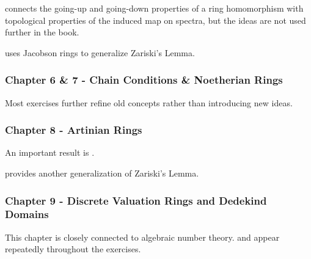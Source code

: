  connects the going-up and going-down properties of a ring homomorphism with topological properties of the induced map on spectra, but the ideas are not used further in the book.

 uses Jacobson rings to generalize Zariski's Lemma.

\subsubsection*{Chapter 6 \& 7 - Chain Conditions \& Noetherian Rings}

Most exercises further refine old concepts rather than introducing new ideas.

\subsubsection*{Chapter 8 - Artinian Rings}

An important result is .

 provides another generalization of Zariski's Lemma.

\subsubsection*{Chapter 9 - Discrete Valuation Rings and Dedekind Domains}

This chapter is closely connected to algebraic number theory.  and  appear repeatedly throughout the exercises.
